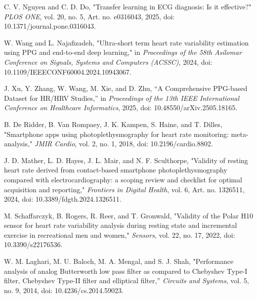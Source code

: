 \documentclass{citask}
\begin{document}
\begin{thebibliography}{1}
C. V. Nguyen and C. D. Do, "Transfer learning in ECG diagnosis: Is it effective?" \emph{PLOS ONE}, vol. 20, no. 5, Art. no. e0316043, 2025, doi: 10.1371/journal.pone.0316043.

W. Wang and L. Najafizadeh, "Ultra-short term heart rate variability estimation using PPG and end-to-end deep learning," in \emph{Proceedings of the 58th Asilomar Conference on Signals, Systems and Computers (ACSSC)}, 2024, doi: 10.1109/IEEECONF60004.2024.10943067.

J. Xu, Y. Zhang, W. Wang, M. Xie, and D. Zhu, “A Comprehensive PPG-based Dataset for HR/HRV Studies,” in \emph{Proceedings of the 13th IEEE International Conference on Healthcare Informatics}, 2025, doi: 10.48550/arXiv.2505.18165.

B. De Ridder, B. Van Rompaey, J. K. Kampen, S. Haine, and T. Dilles, "Smartphone apps using photoplethysmography for heart rate monitoring: meta-analysis," \emph{JMIR Cardio}, vol. 2, no. 1, 2018, doi: 10.2196/cardio.8802.

J. D. Mather, L. D. Hayes, J. L. Mair, and N. F. Sculthorpe, "Validity of resting heart rate derived from contact-based smartphone photoplethysmography compared with electrocardiography: a scoping review and checklist for optimal acquisition and reporting," \emph{Frontiers in Digital Health}, vol. 6, Art. no. 1326511, 2024, doi: 10.3389/fdgth.2024.1326511.

M. Schaffarczyk, B. Rogers, R. Reer, and T. Gronwald, "Validity of the Polar H10 sensor for heart rate variability analysis during resting state and incremental exercise in recreational men and women," \emph{Sensors}, vol. 22, no. 17, 2022, doi: 10.3390/s22176536.

W. M. Laghari, M. U. Baloch, M. A. Mengal, and S. J. Shah, "Performance analysis of analog Butterworth low pass filter as compared to Chebyshev Type-I filter, Chebyshev Type-II filter and elliptical filter,” \emph{Circuits and Systems}, vol. 5, no. 9, 2014, doi: 10.4236/cs.2014.59023.


\end{thebibliography}
\end{document}
